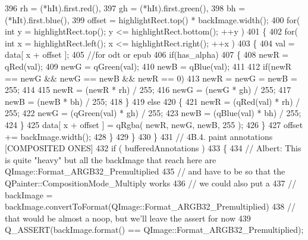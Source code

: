 \begin{DoxyCode}
396                     rh = (*hIt).first.red(),
397                     gh = (*hIt).first.green(),
398                     bh = (*hIt).first.blue(),
399                     offset = highlightRect.top() * backImage.width();
400                 \textcolor{keywordflow}{for}( \textcolor{keywordtype}{int} y = highlightRect.top(); y <= highlightRect.bottom(); ++y )
401                 \{
402                     \textcolor{keywordflow}{for}( \textcolor{keywordtype}{int} x = highlightRect.left(); x <= highlightRect.right(); ++x )
403                     \{
404                         val = data[ x + offset ];
405                         \textcolor{comment}{//for odt or epub}
406                         \textcolor{keywordflow}{if}(has\_alpha)
407                         \{
408                             newR = qRed(val);
409                             newG = qGreen(val);
410                             newB = qBlue(val);
411 
412                             \textcolor{keywordflow}{if}(newR == newG && newG == newB && newR == 0)
413                                 newR = newG = newB = 255;
414 
415                             newR = (newR * rh) / 255;
416                             newG = (newG * gh) / 255;
417                             newB = (newB * bh) / 255;
418                         \}
419                         \textcolor{keywordflow}{else}
420                         \{
421                             newR = (qRed(val) * rh) / 255;
422                             newG = (qGreen(val) * gh) / 255;
423                             newB = (qBlue(val) * bh) / 255;
424                         \}
425                         data[ x + offset ] = qRgba( newR, newG, newB, 255 );
426                     \}
427                     offset += backImage.width();
428                 \}
429             \}
430         \}
431         \textcolor{comment}{// 4B.4. paint annotations [COMPOSITED ONES]}
432         \textcolor{keywordflow}{if} ( bufferedAnnotations )
433         \{
434             \textcolor{comment}{// Albert: This is quite "heavy" but all the backImage that reach here are
       QImage::Format\_ARGB32\_Premultiplied}
435             \textcolor{comment}{// and have to be so that the QPainter::CompositionMode\_Multiply works}
436             \textcolor{comment}{// we could also put a}
437             \textcolor{comment}{// backImage = backImage.convertToFormat(QImage::Format\_ARGB32\_Premultiplied)}
438             \textcolor{comment}{// that would be almost a noop, but we'll leave the assert for now}
439             Q\_ASSERT(backImage.format() == QImage::Format\_ARGB32\_Premultiplied);

\end{DoxyCode}

